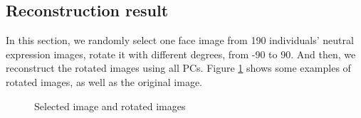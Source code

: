\documentclass{article}
\begin{document}
\subsection{Reconstruction result}
In this section, we randomly select one face image from 190 individuals’ neutral expression images, rotate it
with different degrees, from -90 to 90. And then, we reconstruct the rotated images using all PCs.
Figure \ref{fig:rotatedimage} shows some examples of rotated images, as well as the original image.
\begin{figure}[ht]
  \centering
    \caption[Reconstruction result of apple image]{Selected image and rotated images}
    \label{fig:rotatedimage}
  \end{figure}
\end{document}
